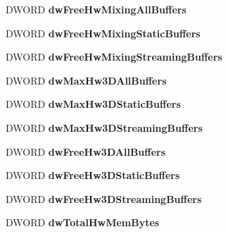 \begin{DoxyCompactItemize}
\item 
D\+W\+O\+RD {\bfseries dw\+Free\+Hw\+Mixing\+All\+Buffers}\hypertarget{struct___d_s_c_a_p_s_ad012687c1fe6ebfad0eaba7e1fd72e24}{}\label{struct___d_s_c_a_p_s_ad012687c1fe6ebfad0eaba7e1fd72e24}

\item 
D\+W\+O\+RD {\bfseries dw\+Free\+Hw\+Mixing\+Static\+Buffers}\hypertarget{struct___d_s_c_a_p_s_a56367d5c0c0b0eb1fbd2903925ddd52a}{}\label{struct___d_s_c_a_p_s_a56367d5c0c0b0eb1fbd2903925ddd52a}

\item 
D\+W\+O\+RD {\bfseries dw\+Free\+Hw\+Mixing\+Streaming\+Buffers}\hypertarget{struct___d_s_c_a_p_s_a61d06b27d0885d632ab4b0362a09fd46}{}\label{struct___d_s_c_a_p_s_a61d06b27d0885d632ab4b0362a09fd46}

\item 
D\+W\+O\+RD {\bfseries dw\+Max\+Hw3\+D\+All\+Buffers}\hypertarget{struct___d_s_c_a_p_s_aebf532fb8ced15674d5036be79c6aef4}{}\label{struct___d_s_c_a_p_s_aebf532fb8ced15674d5036be79c6aef4}

\item 
D\+W\+O\+RD {\bfseries dw\+Max\+Hw3\+D\+Static\+Buffers}\hypertarget{struct___d_s_c_a_p_s_a414aac4889d71650c616d284d2a34f39}{}\label{struct___d_s_c_a_p_s_a414aac4889d71650c616d284d2a34f39}

\item 
D\+W\+O\+RD {\bfseries dw\+Max\+Hw3\+D\+Streaming\+Buffers}\hypertarget{struct___d_s_c_a_p_s_a1f1c91dea1f61ec116631afb8d040de9}{}\label{struct___d_s_c_a_p_s_a1f1c91dea1f61ec116631afb8d040de9}

\item 
D\+W\+O\+RD {\bfseries dw\+Free\+Hw3\+D\+All\+Buffers}\hypertarget{struct___d_s_c_a_p_s_af700461df782af46f4e3a67c65e0ea0c}{}\label{struct___d_s_c_a_p_s_af700461df782af46f4e3a67c65e0ea0c}

\item 
D\+W\+O\+RD {\bfseries dw\+Free\+Hw3\+D\+Static\+Buffers}\hypertarget{struct___d_s_c_a_p_s_a467e983988672ced4e0c928f40773f9d}{}\label{struct___d_s_c_a_p_s_a467e983988672ced4e0c928f40773f9d}

\item 
D\+W\+O\+RD {\bfseries dw\+Free\+Hw3\+D\+Streaming\+Buffers}\hypertarget{struct___d_s_c_a_p_s_a3bf6b7713a0210976870e0660e13b106}{}\label{struct___d_s_c_a_p_s_a3bf6b7713a0210976870e0660e13b106}

\item 
D\+W\+O\+RD {\bfseries dw\+Total\+Hw\+Mem\+Bytes}\hypertarget{struct___d_s_c_a_p_s_a4f6697d62521c353479444671ebd0c63}{}\label{struct___d_s_c_a_p_s_a4f6697d62521c353479444671ebd0c63}


\end{DoxyCompactItemize}
